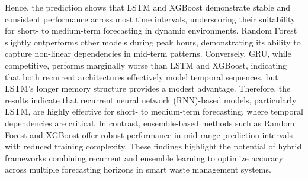 \documentclass[final,5p,times,twocolumn]{elsarticle}
\begin{document}
Hence, the prediction shows that LSTM and XGBoost demonstrate stable and consistent performance across most time intervals, underscoring their suitability for short- to medium-term forecasting in dynamic environments. Random Forest slightly outperforms other models during peak hours, demonstrating its ability to capture non-linear dependencies in mid-term patterns. Conversely, GRU, while competitive, performs marginally worse than LSTM and XGBoost, indicating that both recurrent architectures effectively model temporal sequences, but LSTM's longer memory structure provides a modest advantage. Therefore, the results indicate that recurrent neural network (RNN)-based models, particularly LSTM, are highly effective for short- to medium-term forecasting, where temporal dependencies are critical. In contrast, ensemble-based methods such as Random Forest and XGBoost offer robust performance in mid-range prediction intervals with reduced training complexity. These findings highlight the potential of hybrid frameworks combining recurrent and ensemble learning to optimize accuracy across multiple forecasting horizons in smart waste management systems.

\begin{table}[htbp]
\centering
\caption{24-Hour prediction accuracy comparison}
\label{table3}
\end{table}
\end{document}
